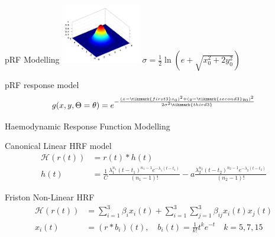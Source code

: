 \documentclass{beamer}
\begin{document}
	\begin{frame}{pRF Modelling}
		\includegraphics[height=7.0em]{2d.png}
		$\sigma = \frac{1}{2} \ln(e + \sqrt{x_0^2 + 2y_0^2})$
			\begin{exampleblock}{pRF response model}
			\[
			g(x, y, \Theta=\theta) = e^{-\frac{(x-\tikzmark{first3}x_0)^2+(y-\tikzmark{second3}y_0)^2}{2\sigma^2\tikzmark{third3}}}
			\]
		\end{exampleblock}	\end{frame}


		\begin{frame}{Haemodynamic Response Function Modelling}
		\begin{exampleblock}{Canonical Linear HRF model}
		  \begin{align*}
		\mathcal{H}(r(t)) &= r(t) * h(t)\\
	h(t) &= \frac{1}{C}\frac{\lambda_1^{n_1} (t-t_1)^{n_1-1} e^{-\lambda_1(t-t_1)}}{(n_1-1)!}-a\frac{\lambda_2^{n_2} (t-t_2)^{n_2-1} e^{-\lambda_2(t-t_2)}}{(n_2-1)!}
		\end{align*}
		\end{exampleblock}	

			\begin{exampleblock}{Friston Non-Linear HRF}
			   \begin{align*}
			\mathcal{H}(r(t)) &= \sum_{i=1}^{3}\beta_i x_i(t)+\sum_{i=1}^{3}\sum_{j=1}^{3}\beta_{ij} x_i(t)x_j(t)\\
			x_i(t) &= (r * b_i)(t), \quad b_i(t) = \frac{1}{k!} t^k e^{-t} \quad k=5,7,15
			\end{align*}
			\end{exampleblock}
		\end{frame}
	
\end{document}
